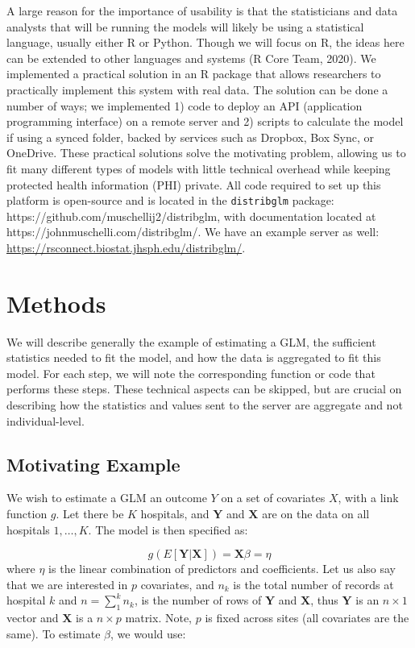 \documentclass[]{elsarticle} %
\begin{document}
A large reason for the importance of usability is that the statisticians and data analysts that will be running the models will likely be using a statistical language, usually either R or Python. Though we will focus on R, the ideas here can be extended to other languages and systems (R Core Team, 2020). We implemented a practical solution in an R package that allows researchers to practically implement this system with real data. The solution can be done a number of ways; we implemented 1) code to deploy an API (application programming interface) on a remote server and 2) scripts to calculate the model if using a synced folder, backed by services such as Dropbox, Box Sync, or OneDrive. These practical solutions solve the motivating problem, allowing us to fit many different types of models with little technical overhead while keeping protected health information (PHI) private. All code required to set up this platform is open-source and is located in the \texttt{distribglm} package: https://github.com/muschellij2/distribglm, with documentation located at https://johnmuschelli.com/distribglm/. We have an example server as well: \url{https://rsconnect.biostat.jhsph.edu/distribglm/}.

\hypertarget{methods}{%
\section{Methods}\label{methods}}

We will describe generally the example of estimating a GLM, the sufficient statistics needed to fit the model, and how the data is aggregated to fit this model. For each step, we will note the corresponding function or code that performs these steps. These technical aspects can be skipped, but are crucial on describing how the statistics and values sent to the server are aggregate and not individual-level.

\hypertarget{motivating-example}{%
\subsection{Motivating Example}\label{motivating-example}}

We wish to estimate a GLM an outcome \(Y\) on a set of covariates \(X\), with a link function \(g\). Let there be \(K\) hospitals, and \(\mathbf{Y}\) and \(\mathbf{X}\) are on the data on all hospitals \(1, \dots, K\). The model is then specified as:

\[
g(E[\mathbf{Y} | \mathbf{X}]) = \mathbf{X}\beta = \eta
\]
where \(\eta\) is the linear combination of predictors and coefficients. Let us also say that we are interested in \(p\) covariates, and \(n_{k}\) is the total number of records at hospital \(k\) and \(n = \sum\limits_{1}^{k} n_{k}\), is the number of rows of \(\mathbf{Y}\) and \(\mathbf{X}\), thus \(\mathbf{Y}\) is an \(n \times 1\) vector and \(\mathbf{X}\) is a \(n \times p\) matrix. Note, \(p\) is fixed across sites (all covariates are the same). To estimate \(\beta\), we would use:
\end{document}
